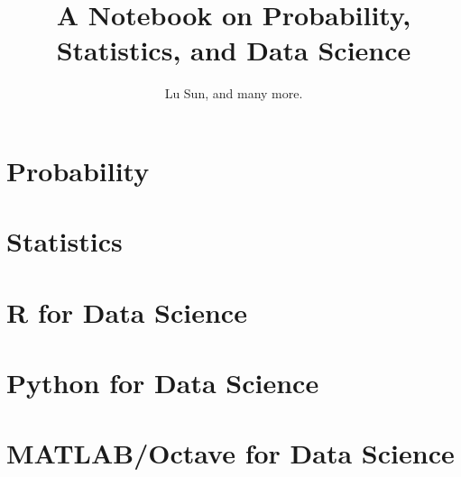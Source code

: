 



\makeindex



\frontmatter

\title{A Notebook on Probability, Statistics, and Data Science}
\author{Lu Sun, and many more.}

\maketitle


\tableofcontents


\listoffigures
\listoftables

\mainmatter

\part{Probability}







\part{Statistics}












\part{R for Data Science}





\part{Python for Data Science}







\part{MATLAB/Octave for Data Science}






\printindex


